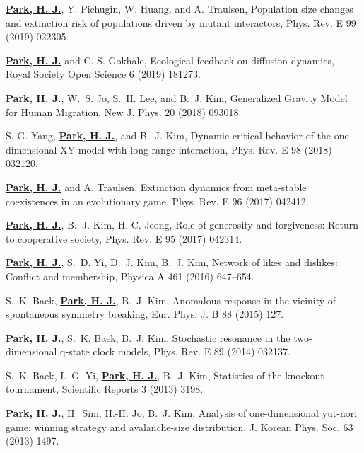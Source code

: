 \documentclass[11pt,a4paper,sans]{moderncv}        %
\begin{document}
\begin{etaremune}
\item
\underline{\textbf{Park, H. J.}}, Y. Pichugin, W. Huang, and A. Traulsen,
Population size changes and extinction risk of populations driven by mutant interactors, Phys. Rev. E 99 (2019) 022305.

\item
\underline{\textbf{Park, H. J.}} and C. S. Gokhale,
Ecological feedback on diffusion dynamics, Royal Society Open Science 6 (2019) 181273.


\item
\underline{\textbf{Park, H. J.}}, W.~S. Jo, S.~H. Lee, and B.~J. Kim,
Generalized Gravity Model for Human Migration, New J. Phys. 20 (2018) 093018.


\item
S.-G. Yang, \underline{\textbf{Park, H. J.}}, and B.~J. Kim,
Dynamic critical behavior of the one-dimensional XY model with long-range interaction, Phys. Rev. E 98 (2018) 032120.


\item
\underline{\textbf{Park, H. J.}} and A. Traulsen,
Extinction dynamics from meta-stable coexistences in an evolutionary game, 
Phys. Rev. E 96 (2017) 042412.


\item
\underline{\textbf{Park, H. J.}}, B.~J. Kim, H.-C. Jeong, Role of generosity
  and forgiveness: Return to cooperative society, Phys. Rev. E 95 (2017)
  042314.

\item
\underline{\textbf{Park, H. J.}}, S.~D. Yi, D.~J. Kim, B.~J. Kim, Network of
  likes and dislikes: Conflict and membership, Physica A 461 (2016) 647--654.

\item
S.~K. Baek, \underline{\textbf{Park, H. J.}}, B.~J. Kim, Anomalous response in
  the vicinity of spontaneous symmetry breaking, Eur. Phys. J. B 88 (2015) 127.

\item
\underline{\textbf{Park, H. J.}}, S.~K. Baek, B.~J. Kim, Stochastic resonance
  in the two-dimensional q-state clock models, Phys. Rev. E 89 (2014) 032137.

\item
S.~K. Baek, I.~G. Yi, \underline{\textbf{Park, H. J.}}, B.~J. Kim, Statistics
  of the knockout tournament, Scientific Reports 3 (2013) 3198.

\item
\underline{\textbf{Park, H. J.}}, H.~Sim, H.-H. Jo, B.~J. Kim, Analysis of
  one-dimensional yut-nori game: winning strategy and avalanche-size
  distribution, J. Korean Phys. Soc. 63 (2013) 1497.

\end{etaremune}
\end{document}
